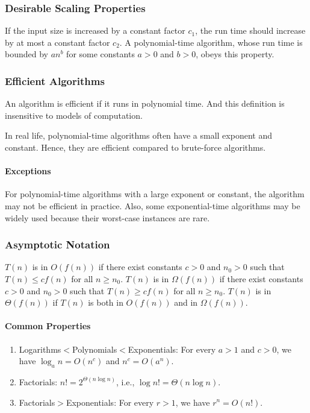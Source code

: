 \documentclass[a4paper,12pt]{article}
\begin{document}
\subsubsection{Desirable Scaling Properties}

If the input size is increased by a constant factor $c_1$, the run time should increase by at most a constant factor $c_2$. A polynomial-time algorithm, whose run time is bounded by $a n^b$ for some constants $a>0$ and $b>0$, obeys this property.

\subsubsection{Efficient Algorithms}

An algorithm is efficient if it runs in polynomial time. And this definition is insensitive to models of computation.

In real life, polynomial-time algorithms often have a small exponent and constant. Hence, they are efficient compared to brute-force algorithms.

\paragraph{Exceptions} For polynomial-time algorithms with a large exponent or constant, the algorithm may not be efficient in practice. Also, some exponential-time algorithms may be widely used because their worst-case instances are rare.

\subsubsection{Asymptotic Notation}

$T(n)$ is in $O(f(n))$ if there exist constants $c>0$ and $n_0>0$ such that $T(n) \leq c f(n)$ for all $n \geq n_0$.
$T(n)$ is in $\Omega(f(n))$ if there exist constants $c>0$ and $n_0>0$ such that $T(n) \geq c f(n)$ for all $n \geq n_0$.
$T(n)$ is in $\Theta(f(n))$ if $T(n)$ is both in $O(f(n))$ and in $\Omega(f(n))$.

\paragraph{Common Properties}

\begin{enumerate}
	\item Logarithms$<$Polynomials$<$Exponentials: For every $a>1$ and $c>0$, we have $\log_a n = O(n^c)$ and $n^c = O(a^n)$.
	\item Factorials: $n! = 2^{\Theta(n \log n)}$, i.e., $\log n! = \Theta(n \log n)$.
	\item Factorials$>$Exponentials: For every $r>1$, we have $r^n = O(n!)$.
\end{enumerate}
\end{document}
